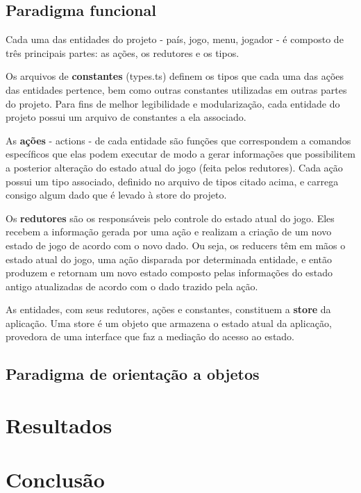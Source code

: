 \documentclass[rel_mlp]{iiufrgs}
\begin{document}
\section{Paradigma funcional}
Cada uma das entidades do projeto - país, jogo, menu, jogador - é composto de três principais partes: as ações, os redutores e os tipos. \par
Os arquivos de \textbf{constantes} (types.ts) definem os tipos que cada uma das ações das entidades pertence, bem como outras constantes utilizadas em outras partes do projeto. Para fins de melhor legibilidade e modularização, cada entidade do projeto possui um arquivo de constantes a ela associado. \par
As \textbf{ações} - actions - de cada entidade são funções que correspondem a comandos específicos que elas podem executar de modo a gerar informações que possibilitem a posterior alteração do estado atual do jogo (feita pelos redutores). Cada ação possui um tipo associado, definido no arquivo de tipos citado acima, e carrega consigo algum dado que é levado à store do projeto. \par
Os \textbf{redutores} são os responsáveis pelo controle do estado atual do jogo. Eles recebem a informação gerada por uma ação e realizam a criação de um novo estado de jogo de acordo com o novo dado. Ou seja, os reducers têm em mãos o estado atual do jogo, uma ação disparada por determinada entidade, e então produzem e retornam um novo estado composto pelas informações do estado antigo atualizadas de acordo com o dado trazido pela ação. \par
As entidades, com seus redutores, ações e constantes, constituem a \textbf{store} da aplicação. Uma store é um objeto que armazena o estado atual da aplicação, provedora de uma interface que faz a mediação do acesso ao estado. \par


\section{Paradigma de orientação a objetos}

\chapter{Resultados}

\chapter{Conclusão}
\end{document}
